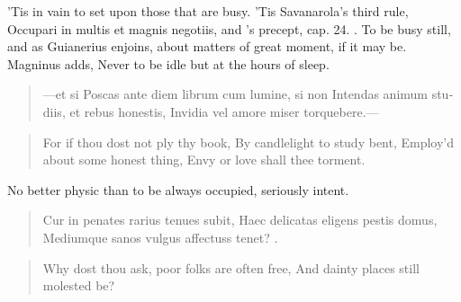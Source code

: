 'Tis in vain to set upon those that are busy. 'Tis Savanarola's third
rule, Occupari in multis et magnis negotiis, and \Avicenna{}'s precept,
cap. 24. . To be busy still,
and as Guianerius enjoins, about matters of great moment, if it
may be. Magninus adds, Never to be idle but at the hours of
sleep.

\begin{latin}
\begin{verse}
---et si
Poscas ante diem librum cum lumine, si non
Intendas animum studiis, et rebus honestis,
Invidia vel amore miser torquebere.---
\end{verse}
\end{latin}
\translationrule%
\begin{verse}%
For if thou dost not ply thy book,
By candlelight to study bent,
Employ'd about some honest thing,
Envy or love shall thee torment.
\end{verse}%

No better physic than to be always occupied, seriously intent.

\begin{latin}
\begin{verse}
Cur in penates rarius tenues subit,
Haec delicatas eligens pestis domus,
Mediumque sanos vulgus affectuss tenet? \etc{}.
\end{verse}
\end{latin}
\translationrule%
\begin{verse}%
Why dost thou ask, poor folks are often free,
And dainty places still molested be?
\end{verse}%


